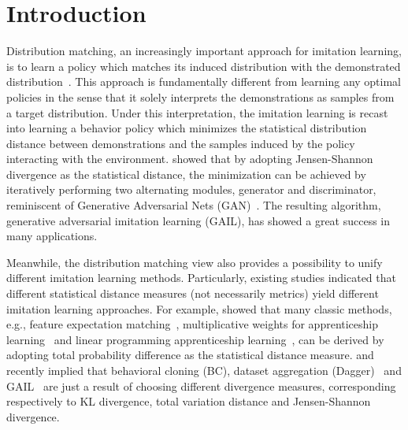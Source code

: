 \section{Introduction}
Distribution matching, 
an increasingly important approach for imitation learning, 
is to learn a policy which matches its induced distribution with the demonstrated distribution~\citep{ho2016generative}.
This approach is fundamentally different from learning any optimal policies in the sense that it solely interprets the demonstrations as samples from a target distribution.
Under this interpretation, the imitation learning is recast into learning a behavior policy which minimizes the statistical distribution distance between demonstrations and the samples induced by the policy interacting with the environment.
\citet{ho2016generative} showed that by adopting Jensen-Shannon divergence as the statistical distance,
the minimization can be achieved by iteratively performing two alternating modules, generator and discriminator, 
reminiscent of Generative Adversarial Nets (GAN)~\citep{goodfellow2014generative}. 
The resulting algorithm, generative adversarial imitation learning (GAIL), has showed a great success in many applications.  


Meanwhile, the distribution matching view also provides a possibility to unify different imitation learning methods. 
Particularly, existing studies indicated that different statistical distance measures (not necessarily metrics) yield different imitation learning approaches.
For example, \citet{ho2016generative} showed that many classic methods, e.g., feature expectation matching~\citep{abbeel2004apprenticeship}, multiplicative weights for apprenticeship learning~\citep{syed2008game} and linear programming apprenticeship learning~\citep{syed2008apprenticeship}, 
can be derived by adopting total probability difference as the statistical distance measure.
\citet{ke2019imitation} and \citet{ghasemipour2020divergence} recently implied that behavioral cloning (BC), dataset aggregation (Dagger)~\citep{ross2011reduction} and GAIL~\citep{ho2016generative} are just a result of choosing different divergence measures, 
corresponding respectively to KL divergence, total variation distance and Jensen-Shannon divergence. 


